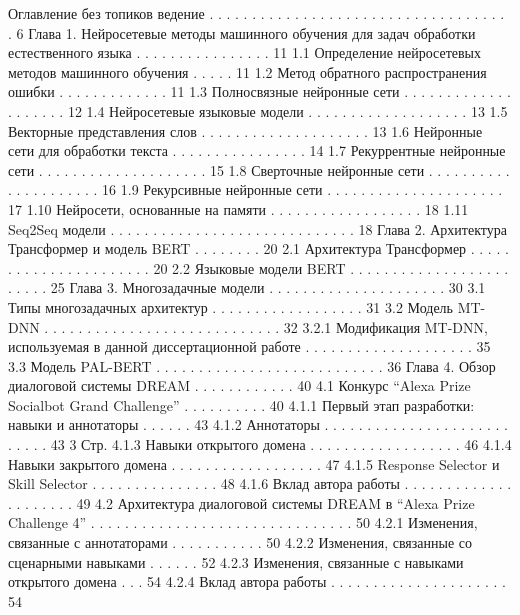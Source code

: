 \iffalse
Оглавление без топиков
ведение . . . . . . . . . . . . . . . . . . . . . . . . . . . . . . . . . . . . 6
Глава 1. Нейросетевые методы машинного обучения для задач
обработки естественного языка . . . . . . . . . . . . . . . . 11
1.1 Определение нейросетевых методов машинного обучения . . . . . 11
1.2 Метод обратного распространения ошибки . . . . . . . . . . . . . 11
1.3 Полносвязные нейронные сети . . . . . . . . . . . . . . . . . . . . 12
1.4 Нейросетевые языковые модели . . . . . . . . . . . . . . . . . . . 13
1.5 Векторные представления слов . . . . . . . . . . . . . . . . . . . . 13
1.6 Нейронные сети для обработки текста . . . . . . . . . . . . . . . . 14
1.7 Рекуррентные нейронные сети . . . . . . . . . . . . . . . . . . . . 15
1.8 Сверточные нейронные сети . . . . . . . . . . . . . . . . . . . . . 16
1.9 Рекурсивные нейронные сети . . . . . . . . . . . . . . . . . . . . . 17
1.10 Нейросети, основанные на памяти . . . . . . . . . . . . . . . . . . 18
1.11 Seq2Seq модели . . . . . . . . . . . . . . . . . . . . . . . . . . . . . 18
Глава 2. Архитектура Трансформер и модель BERT . . . . . . . . 20
2.1 Архитектура Трансформер . . . . . . . . . . . . . . . . . . . . . . 20
2.2 Языковые модели BERT . . . . . . . . . . . . . . . . . . . . . . . . 25
Глава 3. Многозадачные модели . . . . . . . . . . . . . . . . . . . . . 30
3.1 Типы многозадачных архитектур . . . . . . . . . . . . . . . . . . 31
3.2 Модель MT-DNN . . . . . . . . . . . . . . . . . . . . . . . . . . . . 32
3.2.1 Модификация MT-DNN, используемая в данной
диссертационной работе . . . . . . . . . . . . . . . . . . . . 35
3.3 Модель PAL-BERT . . . . . . . . . . . . . . . . . . . . . . . . . . . 36
Глава 4. Обзор диалоговой системы DREAM . . . . . . . . . . . . 40
4.1 Конкурс “Alexa Prize Socialbot Grand Challenge” . . . . . . . . . . 40
4.1.1 Первый этап разработки: навыки и аннотаторы . . . . . . 43
4.1.2 Аннотаторы . . . . . . . . . . . . . . . . . . . . . . . . . . . 43
3
Стр.
4.1.3 Навыки открытого домена . . . . . . . . . . . . . . . . . . 46
4.1.4 Навыки закрытого домена . . . . . . . . . . . . . . . . . . 47
4.1.5 Response Selector и Skill Selector . . . . . . . . . . . . . . . 48
4.1.6 Вклад автора работы . . . . . . . . . . . . . . . . . . . . . 49
4.2 Архитектура диалоговой системы DREAM в “Alexa Prize
Challenge 4” . . . . . . . . . . . . . . . . . . . . . . . . . . . . . . . 50
4.2.1 Изменения, связанные с аннотаторами . . . . . . . . . . . 50
4.2.2 Изменения, связанные со сценарными навыками . . . . . . 52
4.2.3 Изменения, связанные с навыками открытого домена . . . 54
4.2.4 Вклад автора работы . . . . . . . . . . . . . . . . . . . . . 54
